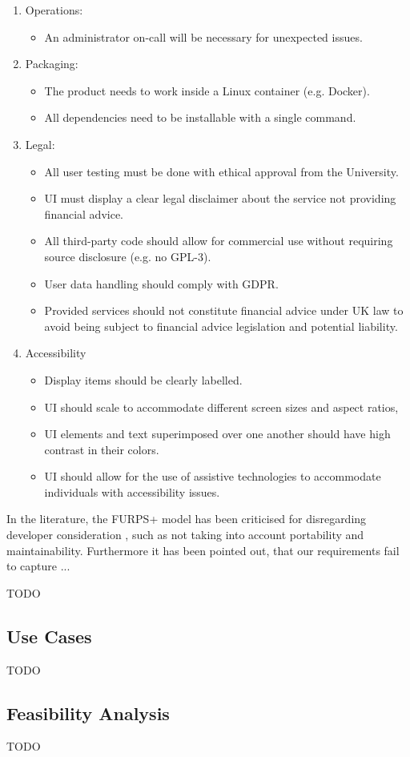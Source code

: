 \documentclass[main.tex]{subfiles}
\begin{document}
\begin{enumerate}
\begin{itemize}
   \end{itemize}
       \item Operations:
      \begin{itemize}
     \item An administrator on-call will be necessary for unexpected issues.
   \end{itemize}
          \item Packaging:
      \begin{itemize}
     \item The product needs to work inside a Linux container (e.g. Docker).
     \item All dependencies need to be installable with a single command.
   \end{itemize}
             \item Legal:
      \begin{itemize}
     \item All user testing must be done with ethical approval from the University.
     \item UI must display a clear legal disclaimer about the service not providing financial advice.
     \item All third-party code should allow for commercial use without requiring source disclosure (e.g. no GPL-3).
     \item User data handling should comply with GDPR.
     \item Provided services should not constitute financial advice under UK law to avoid being subject to financial advice legislation and potential liability.
   \end{itemize}
             \item Accessibility
      \begin{itemize}
     \item Display items should be clearly labelled.
     \item UI should scale to accommodate different screen sizes and aspect ratios,
     \item UI elements and text superimposed over one another should have high contrast in their colors.
     \item UI should allow for the use of assistive technologies to accommodate individuals with accessibility issues.
   \end{itemize}
\end{enumerate}

In the literature, the FURPS+ model has been criticised for disregarding developer consideration  \cite{FURPS_drawbacks}, such as not taking into account portability and maintainability. 
Furthermore it has been pointed out, that our requirements fail to capture ...

TODO

\subsection{Use Cases}
TODO
\subsection{Feasibility Analysis}
TODO
\end{document}
